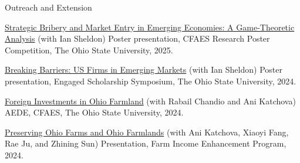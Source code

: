 \documentclass{resume} %
\begin{document}
\begin{rSection}{Outreach and Extension}
\vspace{-1em}
\item \href{https://go.osu.edu/cfaesposters2025}{Strategic Bribery and Market Entry in Emerging Economies: A Game-Theoretic Analysis} (with Ian Sheldon) \newline
Poster presentation, CFAES Research Poster Competition, The Ohio State University, 2025.

\item \href{https://kb.osu.edu/items/414ee0b7-0f29-467f-ae3f-f6b33869eecb}{Breaking Barriers: US Firms in Emerging Markets} (with Ian Sheldon) \newline
Poster presentation, Engaged Scholarship Symposium, The Ohio State University, 2024.

\item \href{https://aede.osu.edu/sites/aede/files/publication_files/ForeignInvestmentsinOhioFarmland2024.pdf}{Foreign Investments in Ohio Farmland} (with Rabail Chandio and Ani Katchova) \newline
AEDE, CFAES, The Ohio State University, 2024.

\item \href{https://aede.osu.edu/about-us/publications/preserving-ohio-farms-and-ohio-farmlands}{Preserving Ohio Farms and Ohio Farmlands} (with Ani Katchova, Xiaoyi Fang, Rae Ju, and Zhining Sun) \newline
Presentation, Farm Income Enhancement Program, 2024.
\end{rSection}
\end{document}
